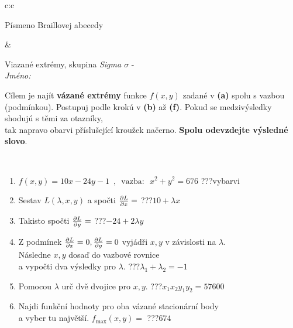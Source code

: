 \documentclass[10pt]{report}
\begin{document}
\begin{tabular}{c:c}
\begin{minipage}[c][104.5mm][t]{0.5\linewidth}
\begin{center}
\begin{minipage}{0.20\linewidth}
\begin{center}
{\small Písmeno Braillovej abecedy}
\end{center}
\end{minipage}
\end{center}
\end{minipage}
&
\begin{minipage}[c][104.5mm][t]{0.5\linewidth}
\begin{center}
\vspace{7mm}
{\huge Viazané extrémy, skupina \textit{Sigma $\sigma$} -}\\[5mm]
\textit{Jméno:}\phantom{xxxxxxxxxxxxxxxxxxxxxxxxxxxxxxxxxxxxxxxxxxxxxxxxxxxxxxxxxxxxxxxxx}\\[5mm]
\begin{minipage}{0.95\linewidth}
\begin{center}
Cílem je najít \textbf{vázané extrémy} funkce $f(x,y)$ zadané v \textbf{(a)} spolu s vazbou (podmínkou). Postupuj podle krokú v \textbf{(b)} až \textbf{(f)}. Pokud se medzivýsledky shodujú s těmi za otazníky,\\tak napravo obarvi příslušející kroužek načerno. \textbf{Spolu odevzdejte výsledné slovo}.
\end{center}
\end{minipage}
\\[1mm]
\begin{minipage}{0.79\linewidth}
\begin{center}
\begin{varwidth}{\linewidth}
\begin{enumerate}
\normalsize
\item $f(x,y)=10x-24y-1 \enspace , \enspace \mathrm{vazba:} \enspace x^2+y^2=676$\quad \dotfill\; ???\;\dotfill \quad vybarvi
\item Sestav $L(\lambda,x,y)$ a spočti $\pdv{L}{x}=$\quad \dotfill\; ???\;\dotfill \quad $10+\lambda x$
\item Takisto spočti $\pdv{L}{y}=$\quad \dotfill\; ???\;\dotfill \quad $-24+2\lambda y$
\item Z podmínek $\pdv{L}{x}=0 , \pdv{L}{y}=0$ vyjádři $x,y$ v závislosti na $\lambda$.\\ \phantom{xxxxxx}Následne $x,y$ dosaď do vazbové rovnice\\ \phantom{xxxxxx}a vypočti dva výsledky pro $\lambda$.\quad \dotfill\; ???\;\dotfill \quad $\lambda_1+\lambda_2=-1$
\item Pomocou $\lambda$ urč dvě dvojice pro $x,y$.\quad \dotfill\; ???\;\dotfill \quad $x_1 x_2 y_1 y_2=57600$
\item Najdi funkční hodnoty pro oba vázané stacionární body\\ \phantom{xxxxxx}a vyber tu najvětší. $f_{\text{max}}(x,y)=$\quad \dotfill\; ???\;\dotfill \quad $674$

\end{enumerate}
\end{varwidth}
\end{center}
\end{minipage}
\end{center}
\end{minipage}
\end{tabular}
\end{document}
